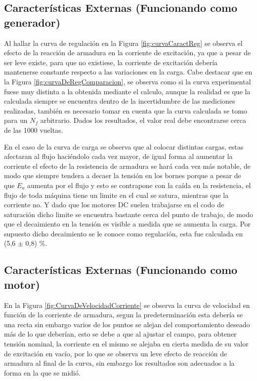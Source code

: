 \documentclass[11pt,letterpaper]{article}     %
\begin{document}
\subsection{Características Externas (Funcionando como generador)}
Al hallar la curva de regulación en la Figura \ref{fig:curvaCaractReg} se observa el efecto de la reacción de armadura en la corriente de excitación, ya que a pesar de ser leve existe, para que no existiese, la corriente de excitación debería mantenerse constante respecto a las variaciones en la carga. Cabe destacar que en la Figura \ref{fig:curvaDeRegComparacion}, se observa como si la curva experimental fuese muy distinta a la obtenida mediante el calculo, aunque la realidad es que la calculada  siempre se encuentra dentro de la incertidumbre de las mediciones realizadas, también es necesario tomar en cuenta que la curva calculada se tomo para un $N_{f}$ arbitrario. Dados los resultados, el valor real debe encontrarse cerca de las 1000 vueltas. 

En el caso de la curva de carga se observa que al colocar distintas cargas, estas afectaran al flujo haciéndolo cada vez mayor, de igual forma al aumentar la corriente el efecto de la resistencia de armadura se hará cada vez más notable, de modo que siempre tendera a decaer la tensión en los bornes porque a pesar de que $E_{a}$ aumenta por el flujo y esto se contrapone con la caída en la resistencia, el flujo de toda máquina tiene un limite en el cual se satura, mientras que la corriente no. Y dado que los motores DC suelen trabajarse en el codo de saturación dicho limite se encuentra bastante cerca del punto de trabajo, de modo que el decaimiento en la tensión es visible a medida que se aumenta la carga. Por supuesto dicho decaimiento se le conoce como regulación, esta fue calculada en (5,6 $\pm$ 0,8) \%.
\subsection{Características Externas (Funcionando como motor)}
En la Figura \ref{fig:CurvaDeVelocidadCorriente} se observa la curva de velocidad en función de la corriente de armadura, segun la predeterminación esta debería se una recta sin embargo varios de los puntos se alejan del comportamiento deseado más de lo que deberían, esto se debe a que al ajustar el campo, para obtener tensión nominal, la corriente en el mismo se alejaba en cierta medida de su valor de excitación en vacío, por lo que se observa un leve efecto de reacción de armadura al final de la curva, sin embargo los resultados son adecuados a la forma en la que se midió.
\end{document}
